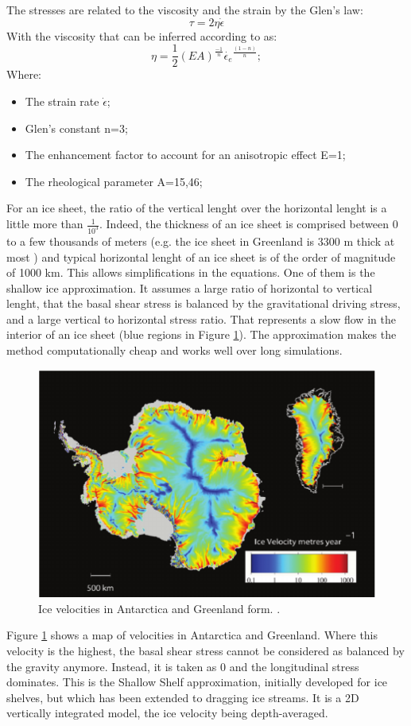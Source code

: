 \documentclass[a4paper,12pt]{article}
\begin{document}
The stresses are related to the viscosity and the strain by the Glen's law:
\begin{equation}
	\tau = 2\eta\dot{\epsilon}
\end{equation}
With the viscosity that can be inferred according to \cite{gagliardini2013capabilities} as:
\begin{equation}
	\eta = \frac{1}{2}(EA)^\frac{-1}{n} \dot{\epsilon_e}^\frac{(1-n)}{n};
\end{equation}
Where:
\begin{itemize}
	\item The strain rate $\dot{\epsilon}$;
	\item Glen's constant n=3;
	\item The enhancement factor to account for an anisotropic effect E=1;
	\item The rheological parameter A=15,46;
\end{itemize}
For an ice sheet, the ratio of the vertical lenght over the horizontal lenght is a little more than $\frac{1}{10^3}$. Indeed, the thickness of an ice sheet is comprised between 0 to a few thousands of meters (e.g. the ice sheet in Greenland is 3300 m thick at most \cite[]{bamber2001new}) and typical horizontal lenght of an ice sheet is of the order of magnitude of 1000 km. This allows simplifications in the equations. One of them is the shallow ice approximation. It assumes a large ratio of horizontal to vertical lenght, that the basal shear stress is balanced by  the gravitational driving stress, and a large vertical to horizontal stress ratio. That represents a slow flow in the interior of an ice sheet (blue regions in Figure \ref{velocityglaciar}). The approximation makes the method computationally cheap and works well over long simulations.

\begin{figure}[!h]
	\centering
	\includegraphics[width=0.7\linewidth]{../fig/velocityglaciar}
	\caption{Ice velocities in Antarctica and Greenland form. \cite[]{allison2009ice}.}
	\label{velocityglaciar}
\end{figure}
Figure \ref{velocityglaciar} shows a map of velocities in Antarctica and Greenland. Where this velocity is the highest, the basal shear stress cannot be considered as balanced by the gravity anymore. Instead, it is taken as 0 and the longitudinal stress dominates. This is the Shallow Shelf approximation, initially developed for ice shelves, but which has been extended to dragging ice streams. It is a 2D vertically integrated model, the ice velocity being depth-averaged.
\end{document}
